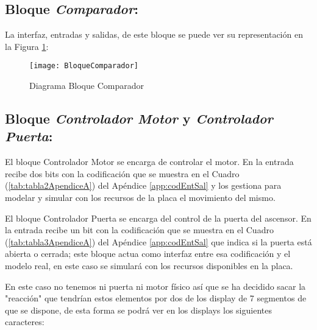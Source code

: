 \subsection{Bloque \textit{Comparador}:}

    La interfaz, entradas y salidas, de este bloque se puede ver su representación en la Figura \ref{fig:BloqueComparador}:
    
    \begin{figure}[H]
		    \centering
		    \texttt{[image: BloqueComparador]}
		    \caption{Diagrama Bloque Comparador}
		    \label{fig:BloqueComparador}
	\end{figure}



\subsection{Bloque \textit{Controlador Motor} y \textit{Controlador Puerta}:}
    El bloque Controlador Motor se encarga de controlar el motor. En la entrada recibe dos bits con la codificación que se muestra en el Cuadro (\ref{tab:tabla2ApendiceA}) del Apéndice \ref{app:codEntSal} y los gestiona para modelar y simular con los recursos de la placa el movimiento del mismo.

    El bloque Controlador Puerta se encarga del control de la puerta del ascensor. En la entrada recibe un bit con la codificación que se muestra en el Cuadro (\ref{tab:tabla3ApendiceA}) del Apéndice \ref{app:codEntSal} que indica si la puerta está abierta o cerrada; este bloque actua como interfaz entre esa codificación y el modelo real, en este caso se simulará con los recursos disponibles en la placa.

    En este caso no tenemos ni puerta ni motor físico así que se ha decidido sacar la "reacción" que tendrían estos elementos por dos de los display de 7 segmentos de que se dispone, de esta forma se podrá ver en los displays los siguientes caracteres:

